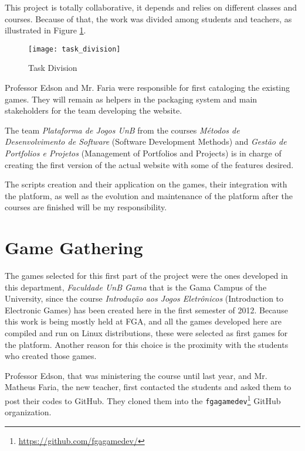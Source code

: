 This project is totally collaborative, it depends and relies on different classes and courses. Because of that, the work was divided among students and teachers, as illustrated in Figure \ref{fig:task_division}.

\begin{figure}[h!]
\centering
\texttt{[image: task\_division]}
\caption{Task Division}
\label{fig:task_division}
\end{figure}

Professor Edson and Mr. Faria were responsible for first cataloging the existing games. They will remain as helpers in the packaging system and main stakeholders for the team developing the website.

The team \textit{Plataforma de Jogos UnB} from the courses \textit{M\'etodos de Desenvolvimento de Software} (Software Development Methods) and \textit{Gest\~ao de Portfolios e Projetos} (Management of Portfolios and Projects) is in charge of creating the first version of the actual website with some of the features desired.

The scripts creation and their application on the games, their integration with the platform, as well as the evolution and maintenance of the platform after the courses are finished will be my responsibility.


\section{Game Gathering}
\label{sec:game_gathering}

The games selected for this first part of the project were the ones developed in this department, \textit{Faculdade UnB Gama} that is the Gama Campus of the University, since the course \textit{Introdu\c{c}\~ao aos Jogos Eletr\^onicos} (Introduction to Electronic Games) has been created here in the first semester of 2012. Because this work is being mostly held at FGA, and all the games developed here are compiled and run on Linux distributions, these were selected as first games for the platform. Another reason for this choice is the proximity with the students who created those games.

Professor Edson, that was ministering the course until last year, and Mr. Matheus Faria, the new teacher, first contacted the students and asked them to post their codes to GitHub. They cloned them into the \texttt{fgagamedev}\footnote{ \href{https://github.com/fgagamedev}{https://github.com/fgagamedev/} } GitHub organization.

